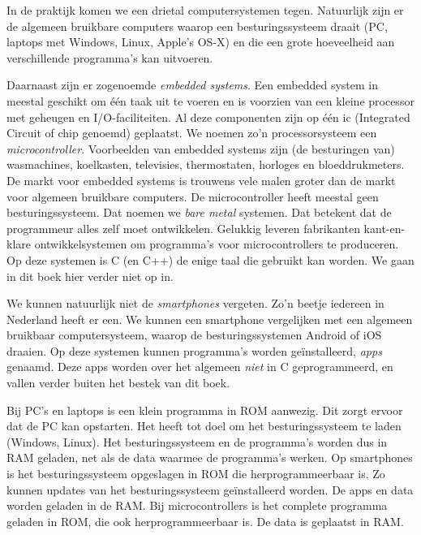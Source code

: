 In de praktijk komen we een drietal computersystemen tegen. Natuurlijk zijn er de algemeen bruikbare computers waarop een besturingssysteem draait (PC, laptops met Windows, Linux, Apple's OS-X) en die een grote hoeveelheid aan verschillende programma's kan uitvoeren.

Daarnaast zijn er zogenoemde \textsl{embedded systems}. Een embedded system in meestal geschikt om één taak uit te voeren en is voorzien van een kleine processor met geheugen en I/O-faciliteiten. Al deze componenten zijn op één ic (Integrated Circuit of chip genoemd) geplaatst. We noemen zo'n processorsysteem een \textsl{microcontroller}. Voorbeelden van embedded systems zijn (de besturingen van) wasmachines, koelkasten, televisies, thermostaten, horloges en bloeddrukmeters. De markt voor embedded systems is trouwens vele malen groter dan de markt voor algemeen bruikbare computers.
De microcontroller heeft meestal geen besturingssysteem. Dat noemen we \textsl{bare metal} systemen. Dat betekent dat de programmeur alles zelf moet ontwikkelen. Gelukkig leveren fabrikanten kant-en-klare ontwikkelsystemen om programma's voor microcontrollers te produceren. Op deze systemen is C (en C++) de enige taal die gebruikt kan worden. We gaan in dit boek hier verder niet op in.
 
We kunnen natuurlijk niet de \textsl{smartphones} vergeten. Zo'n beetje iedereen in Nederland heeft er een. We kunnen een smartphone vergelijken met een algemeen bruikbaar computersysteem, waarop de besturingssystemen Android of iOS draaien. Op deze systemen kunnen programma's worden geïnstalleerd, \textsl{apps} genaamd. Deze apps worden over het algemeen \textsl{niet} in C geprogrammeerd, en vallen verder buiten het bestek van dit boek.

Bij PC's en laptops is een klein programma in ROM aanwezig. Dit zorgt ervoor dat de PC kan opstarten. Het heeft tot doel om het besturingssysteem te laden (Windows, Linux). Het besturingssysteem en de programma's worden dus in RAM geladen, net als de data waarmee de programma's werken. Op smartphones is het besturingssysteem opgeslagen in ROM die herprogrammeerbaar is. Zo kunnen updates van het besturingssysteem geïnstalleerd worden. De apps en data worden geladen in de RAM. Bij microcontrollers is het complete programma geladen in ROM, die ook herprogrammeerbaar is. De data is geplaatst in RAM.



